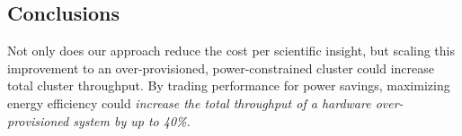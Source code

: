 \documentclass[a0,portrait]{a0poster}
\begin{document}
\begin{multicols}{2}









\color{SaddleBrown} %

\section*{Conclusions}

Not only does our approach reduce the cost per scientific insight, but scaling this improvement to an over-provisioned, power-constrained cluster could increase total cluster throughput.
By trading performance for power savings, maximizing energy efficiency could \emph{increase the total throughput of a hardware over-provisioned system by up to 40\%.}


\color{DarkSlateGray} %






%


\end{multicols}
\end{document}
